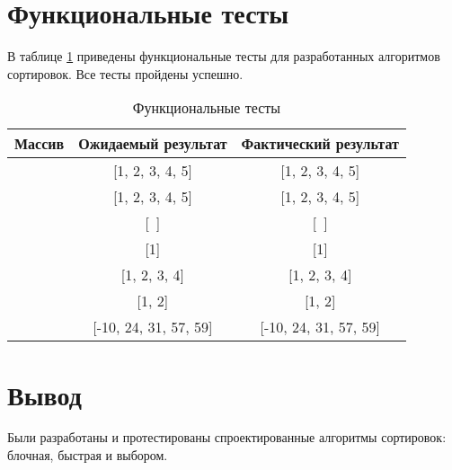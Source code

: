 \clearpage

\section{Функциональные тесты}

В таблице \ref{tbl:func_tests} приведены функциональные тесты для разработанных алгоритмов сортировок. Все тесты пройдены успешно.

\begin{table}[ht]
	\small
	\begin{center}
		\begin{threeparttable}
			\caption{Функциональные тесты}
			\label{tbl:func_tests}
			\begin{tabular}{|c|c|c|}
				\hline
				\bfseries Массив
				& \bfseries Ожидаемый результат
				& \bfseries Фактический результат \\ 
				\hline
				[1, 2, 3, 4, 5] & [1, 2, 3, 4, 5] & [1, 2, 3, 4, 5] \\
				\hline
				[5, 4, 3, 2, 1]  & [1, 2, 3, 4, 5] & [1, 2, 3, 4, 5] \\
				\hline
				[~]  & [~] & [~] \\
				\hline
				[1]  & [1] & [1]\\
				\hline
				[4, 1, 2, 3]  & [1, 2, 3, 4] & [1, 2, 3, 4] \\
				\hline
				[2, 1]  & [1, 2] & [1, 2] \\
				\hline
				[31, 57, 24, -10, 59]  & [-10, 24, 31, 57, 59] & [-10, 24, 31, 57, 59] \\
				\hline
			\end{tabular}	
		\end{threeparttable}	
	\end{center}
\end{table}


\section*{Вывод}
Были разработаны и протестированы спроектированные алгоритмы сортировок: блочная, быстрая и выбором.